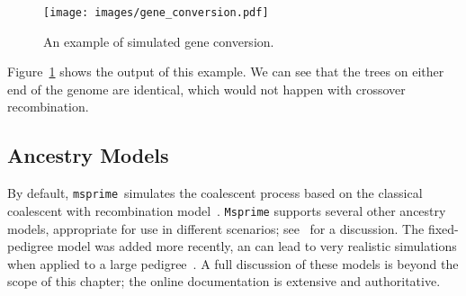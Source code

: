 \documentclass[graybox]{svmult}
\newcommand{\msprime}[0]{\texttt{msprime}}
\begin{document}
\begin{figure}
\begin{center}
\texttt{[image: images/gene\_conversion.pdf]}
\end{center}
\caption{\label{fig:gene_conversion} An example of simulated gene conversion.}
\end{figure}
Figure~\ref{fig:gene_conversion} shows the output of this example. We can see
that the trees on either end of the genome are identical, which would not
happen with crossover recombination.

\subsection{Ancestry Models}\label{ancestry-models}
By default, \msprime\ simulates the coalescent process based on the
classical coalescent with recombination model~\citep{hudson1983properties}.
\texttt{Msprime} supports several other ancestry models, appropriate for use in different
scenarios; see~\cite{baumdicker2022efficient} for a discussion.
The fixed-pedigree model was added more recently, an can lead
to very realistic simulations when applied to a large
pedigree~\cite{andersontrocme2023genes}. A full discussion of these
models is beyond the scope of this chapter; the online documentation
is extensive and authoritative.




\end{document}
